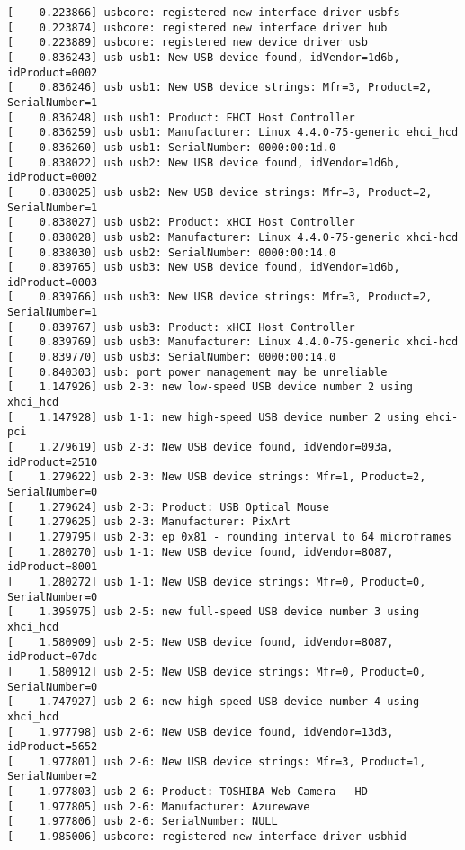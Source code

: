 \begin{verbatim}
[    0.223866] usbcore: registered new interface driver usbfs
[    0.223874] usbcore: registered new interface driver hub
[    0.223889] usbcore: registered new device driver usb
[    0.836243] usb usb1: New USB device found, idVendor=1d6b, idProduct=0002
[    0.836246] usb usb1: New USB device strings: Mfr=3, Product=2, SerialNumber=1
[    0.836248] usb usb1: Product: EHCI Host Controller
[    0.836259] usb usb1: Manufacturer: Linux 4.4.0-75-generic ehci_hcd
[    0.836260] usb usb1: SerialNumber: 0000:00:1d.0
[    0.838022] usb usb2: New USB device found, idVendor=1d6b, idProduct=0002
[    0.838025] usb usb2: New USB device strings: Mfr=3, Product=2, SerialNumber=1
[    0.838027] usb usb2: Product: xHCI Host Controller
[    0.838028] usb usb2: Manufacturer: Linux 4.4.0-75-generic xhci-hcd
[    0.838030] usb usb2: SerialNumber: 0000:00:14.0
[    0.839765] usb usb3: New USB device found, idVendor=1d6b, idProduct=0003
[    0.839766] usb usb3: New USB device strings: Mfr=3, Product=2, SerialNumber=1
[    0.839767] usb usb3: Product: xHCI Host Controller
[    0.839769] usb usb3: Manufacturer: Linux 4.4.0-75-generic xhci-hcd
[    0.839770] usb usb3: SerialNumber: 0000:00:14.0
[    0.840303] usb: port power management may be unreliable
[    1.147926] usb 2-3: new low-speed USB device number 2 using xhci_hcd
[    1.147928] usb 1-1: new high-speed USB device number 2 using ehci-pci
[    1.279619] usb 2-3: New USB device found, idVendor=093a, idProduct=2510
[    1.279622] usb 2-3: New USB device strings: Mfr=1, Product=2, SerialNumber=0
[    1.279624] usb 2-3: Product: USB Optical Mouse
[    1.279625] usb 2-3: Manufacturer: PixArt
[    1.279795] usb 2-3: ep 0x81 - rounding interval to 64 microframes
[    1.280270] usb 1-1: New USB device found, idVendor=8087, idProduct=8001
[    1.280272] usb 1-1: New USB device strings: Mfr=0, Product=0, SerialNumber=0
[    1.395975] usb 2-5: new full-speed USB device number 3 using xhci_hcd
[    1.580909] usb 2-5: New USB device found, idVendor=8087, idProduct=07dc
[    1.580912] usb 2-5: New USB device strings: Mfr=0, Product=0, SerialNumber=0
[    1.747927] usb 2-6: new high-speed USB device number 4 using xhci_hcd
[    1.977798] usb 2-6: New USB device found, idVendor=13d3, idProduct=5652
[    1.977801] usb 2-6: New USB device strings: Mfr=3, Product=1, SerialNumber=2
[    1.977803] usb 2-6: Product: TOSHIBA Web Camera - HD
[    1.977805] usb 2-6: Manufacturer: Azurewave
[    1.977806] usb 2-6: SerialNumber: NULL
[    1.985006] usbcore: registered new interface driver usbhid

\end{verbatim}
